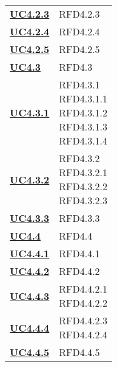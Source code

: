 \begin{longtable}[H]{| >{\centering\bfseries}p{8cm} | >{\centering\arraybackslash}p{8cm} |}
    \hyperref[par:uc4.2.3]{UC4.2.3}  & RFD4.2.3 \\

    \hyperref[par:uc4.2.4]{UC4.2.4} & RFD4.2.4 \\

    \hyperref[par:uc4.2.5]{UC4.2.5} & RFD4.2.5 \\

    \hyperref[ssub:uc4.3]{UC4.3} & RFD4.3 \\

    \hyperref[par:uc4.3.1]{UC4.3.1} & \makecell{
        \rule{0pt}{4ex}
        RFD4.3.1 \\ 
        RFD4.3.1.1 \\ 
        RFD4.3.1.2 \\ 
        RFD4.3.1.3 \\ 
        RFD4.3.1.4
        \rule{0pt}{4ex}
        } \\

    \hyperref[par:uc4.3.2]{UC4.3.2} & \makecell{
        \rule{0pt}{4ex}
        RFD4.3.2 \\ 
        RFD4.3.2.1 \\
        RFD4.3.2.2 \\
        RFD4.3.2.3 \\
        \rule{0pt}{4ex}
        } \\

    \hyperref[par:uc4.3.3]{UC4.3.3} & RFD4.3.3 \\


    \hyperref[ssub:uc4.4]{UC4.4} & RFD4.4 \\

    \hyperref[par:uc4.4.1]{UC4.4.1} & RFD4.4.1 \\

    \hyperref[par:uc4.4.2]{UC4.4.2} & RFD4.4.2 \\

    \hyperref[par:uc4.4.3]{UC4.4.3}  & \makecell{
        \rule{0pt}{4ex}
        RFD4.4.2.1 \\ 
        RFD4.4.2.2 \\
        \rule{0pt}{4ex}
        } \\

    \hyperref[par:uc4.4.4]{UC4.4.4} & \makecell{
        \rule{0pt}{4ex}
        RFD4.4.2.3 \\ 
        RFD4.4.2.4 \\
        \rule{0pt}{4ex}
        } \\

    \hyperref[par:uc4.4.5]{UC4.4.5} & RFD4.4.5 \\





\end{longtable}
